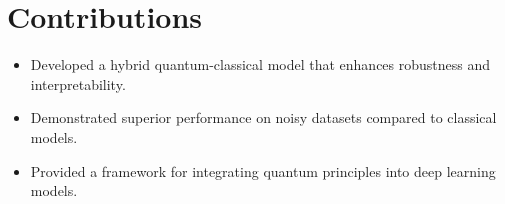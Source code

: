 \documentclass{article}
\begin{document}
\section{Contributions}
\begin{itemize}
    \item Developed a hybrid quantum-classical model that enhances robustness and interpretability.
    \item Demonstrated superior performance on noisy datasets compared to classical models.
    \item Provided a framework for integrating quantum principles into deep learning models.
\end{itemize}
\end{document}
